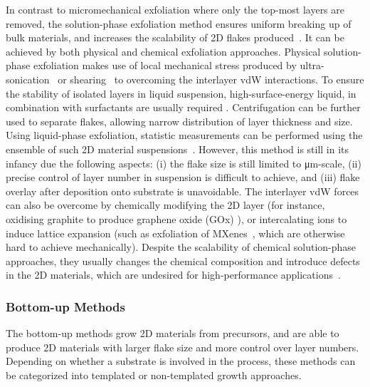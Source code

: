 In contrast to micro\-mechanical exfoliation where only the top-most
layers are removed, the solution-phase exfoliation method ensures
uniform breaking up of bulk materials, and increases the scalability
of 2D flakes produced~\autocite{Coleman_2012_rev}.
It can be achieved by
both physical and chemical exfoliation approaches.
%
Physical solution-phase exfoliation makes use of local mechanical
stress produced by ultra-sonication~\autocite{Xia_2013_liquidphase}
or shearing~\autocite{Paton_2014_shearing} to overcoming the interlayer
vdW interactions. To ensure the stability of isolated layers in 
liquid suspension, high-surface-energy liquid, in combination with
surfactants are usually required
\autocite{Coleman_2012_rev,Paton_2014_shearing,Hanlon_2015_shear,Backes_2014_mos2,Shih_2010_exf,Shih_2011_bitri}.
%
Centrifugation can be further used to separate flakes, allowing narrow
distribution of layer thickness and size.
%
Using liquid-phase exfoliation,
statistic measurements
can be performed using the ensemble of such 2D material
suspensions~\autocite{Backes_2014_mos2}.
%
However, this method is still in its infancy due the following aspects:
(i) the flake size is still limited to μm-scale, (ii) precise control
of layer number in suspension is difficult to achieve,  and (iii) flake overlay
after deposition onto substrate is unavoidable.
%
The interlayer vdW forces can also be overcome by chemically modifying
the 2D layer (for instance, oxidising graphite to produce graphene
oxide (GOx) \autocite{Chen_2013_GO}), or intercalating ions
to induce lattice expansion (such as exfoliation of
MXenes~\autocite{Naguib_2011_Mxene}, which are otherwise hard to achieve
mechanically). Despite the scalability of chemical solution-phase
approaches, they usually changes the chemical composition and
introduce defects in the 2D materials, which are undesired for
high-performance applications~\autocite{Lin_2019_gr_rev_growth}.

\subsubsection{Bottom-up Methods}
\label{sec:bottom-up-methods}

The bottom-up methods grow 2D materials from precursors, and are able
to produce 2D materials with larger flake size and more control over
layer numbers.
%
Depending on whether a substrate is involved in the
process, these methods can be categorized into templated or
non-templated growth approaches.

